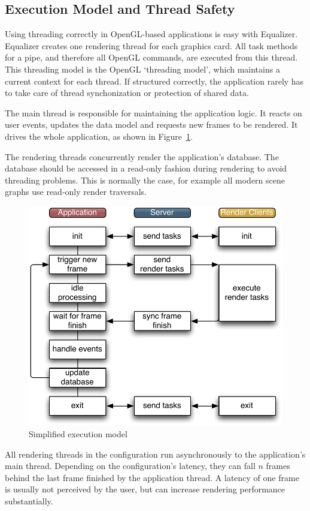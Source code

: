 \documentclass[10pt,a4]{scrartcl}
\newcommand{\fig}[1]{Figure~\ref{#1}}
\begin{document}
\subsection{Execution Model and Thread Safety}

Using threading correctly in OpenGL-based applications is easy with
Equalizer. Equalizer creates one rendering thread for each graphics
card. All task methods for a pipe, and therefore all OpenGL commands,
are executed from this thread. This threading model is the OpenGL
`threading model', which maintains a current context for each
thread. If structured correctly, the application rarely has to take care
of thread synchonization or protection of shared data.

The main thread is responsible for maintaining the application logic. It
reacts on user events, updates the data model and requests new frames to
be rendered. It drives the whole application, as shown in \fig{fModel}.

The rendering threads concurrently render the application's
database. The data\-base should be accessed in a read-only fashion
during rendering to avoid threading problems. This is normally the case,
for example all modern scene graphs use read-only render traversals.

\begin{figure}
  \includegraphics[width=.618\textwidth]{images/model.pdf}
  {\caption{\small\label{fModel}Simplified execution model}}
\end{figure}
All rendering threads in the configuration run asynchronously to the
application's main thread. Depending on the configuration's latency,
they can fall $n$ frames behind the last frame finished by the
application thread. A latency of one frame is usually not perceived by
the user, but can increase rendering performance substantially.
\end{document}
